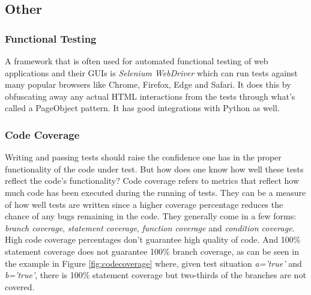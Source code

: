\subsection{Other} \label{subsec:other}
\subsubsection{Functional Testing}
A framework that is often used for automated functional testing of web applications and their GUIs is \textit{Selenium WebDriver} which can run tests against many popular browsers like Chrome, Firefox, Edge and Safari.\cite{selenium} It does this by obfuscating away any actual HTML interactions from the tests through what's called a PageObject pattern.\cite{fowler-page} It has good integrations with Python as well.\cite{selenium-python}

\subsubsection{Code Coverage}
Writing and passing tests should raise the confidence one has in the proper functionality of the code under test. But how does one know how well these tests reflect the code's functionality? Code coverage refers to metrics that reflect how much code has been executed during the running of tests. They can be a measure of how well tests are written since a higher coverage percentage reduces the chance of any bugs remaining in the code. They generally come in a few forms: \textit{branch coverage}, \textit{statement coverage}, \textit{function coverage} and \textit{condition coverage}. High code coverage percentages don't guarantee high quality of code.\cite{cov-misuse} And 100\% statement coverage does not guarantee 100\% branch coverage, as can be seen in the example in Figure \ref{fig:codecoverage} where, given test situation \textit{a='true'} and \textit{b='true'}, there is 100\% statement coverage but two-thirds of the branches are not covered.

